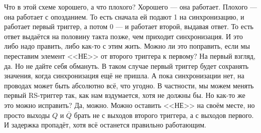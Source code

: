 \documentclass{article}
\begin{document}
    Что в этой схеме хорошего, а что плохого? Хорошего --- она работает. Плохого --- она работает с опозданием. То есть сначала ей подают 1 на синхронизацию, и работает первый триггер, а потом 0 --- и работает второй, выдавая ответ. То есть ответ выдаётся на половину такта позже, чем приходит синхронизация. И это либо надо править, либо как-то с этим жить. Можно ли это поправить, если мы переставим элемент <<НЕ>> от второго триггера к первому? На первый взгляд, да. Но не дайте себя обмануть. В таком случае первый триггер будет сохранять значения, когда синхронизация ещё не пришла. А пока синхронизации нет, на проводах может быть абсолютно всё, что угодно. В частности, мы можем менять первый RS-триггер так, как нам вздумается, хотя не должны бы. Но как-то же это можно исправить? Да, можно. Можно оставить <<НЕ>> на своём месте, но просто выходы $Q$ и $\overline Q$ брать не с выходов второго триггера, а с выходов первого. И задержка пропадёт, хотя всё останется правильно работающим.
\end{document}
